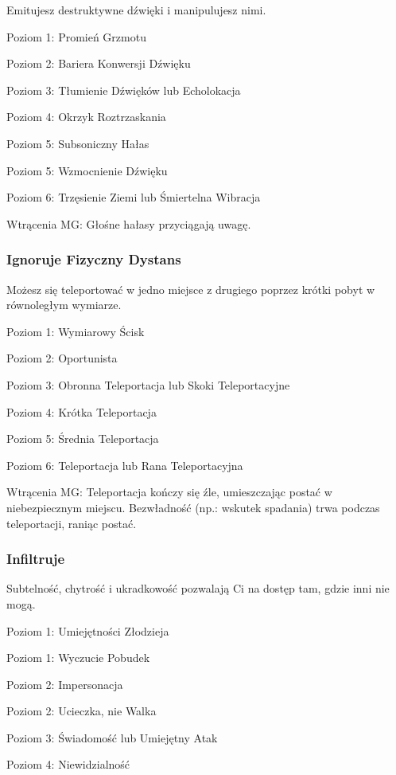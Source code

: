 Emitujesz destruktywne dźwięki i manipulujesz nimi.

Poziom 1: Promień Grzmotu

Poziom 2: Bariera Konwersji Dźwięku

Poziom 3: Tłumienie Dźwięków lub Echolokacja

Poziom 4: Okrzyk Roztrzaskania

Poziom 5: Subsoniczny Hałas

Poziom 5: Wzmocnienie Dźwięku

Poziom 6: Trzęsienie Ziemi lub Śmiertelna Wibracja

Wtrącenia MG: Głośne hałasy przyciągają uwagę.

\subsubsection{Ignoruje Fizyczny Dystans}

Możesz się teleportować w jedno miejsce z drugiego poprzez krótki pobyt w równoległym wymiarze.

Poziom 1: Wymiarowy Ścisk

Poziom 2: Oportunista

Poziom 3: Obronna Teleportacja lub Skoki Teleportacyjne

Poziom 4: Krótka Teleportacja

Poziom 5: Średnia Teleportacja

Poziom 6: Teleportacja lub Rana Teleportacyjna

Wtrącenia MG: Teleportacja kończy się źle, umieszczając postać w niebezpiecznym miejscu. Bezwładność (np.: wskutek spadania) trwa podczas teleportacji, raniąc postać. 

\subsubsection{Infiltruje}

Subtelność, chytrość i ukradkowość pozwalają Ci na dostęp tam, gdzie inni nie mogą.

Poziom 1: Umiejętności Złodzieja

Poziom 1: Wyczucie Pobudek

Poziom 2: Impersonacja

Poziom 2: Ucieczka, nie Walka

Poziom 3: Świadomość lub Umiejętny Atak

Poziom 4: Niewidzialność

